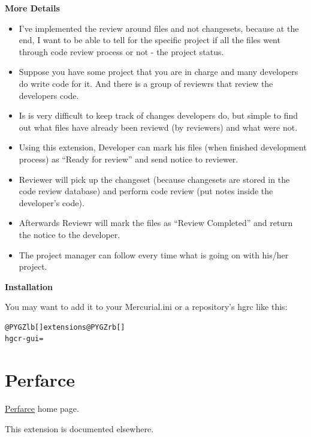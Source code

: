 \documentclass[letterpaper,10pt,english]{manual}
\begin{document}
\textbf{More Details}
\begin{itemize}
\item {} 
I've implemented the review around files and not changesets, because at the end,
I want to be able to tell for the specific project if all the files went through
code review process or not - the project status.

\item {} 
Suppose you have some project that you are in charge and many developers do
write code for it. And there is a group of reviewrs that review the developers code.

\item {} 
Is is very difficult to keep track of changes developers do, but simple to find
out what files have already been reviewd (by reviewers) and what were not.

\item {} 
Using this extension, Developer can mark his files (when finished development
process) as ``Ready for review'' and send notice to reviewer.

\item {} 
Reviewer will pick up the changeset (because changesets are stored in the code
review database) and perform code review (put notes inside the developer's code).

\item {} 
Afterwards Reviewr will mark the files as ``Review Completed'' and return the
notice to the developer.

\item {} 
The project manager can follow every time what is going on with his/her project.

\end{itemize}

\textbf{Installation}

You may want to add it to your Mercurial.ini or a repository's hgrc like this:

\begin{Verbatim}[commandchars=@\[\]]
@PYGZlb[]extensions@PYGZrb[]
hgcr-gui=
\end{Verbatim}


\section{Perfarce}

\href{http://www.kingswood-consulting.co.uk/hg/perfarce/}{Perfarce} home
page.

This extension is documented elsewhere.
\end{document}
